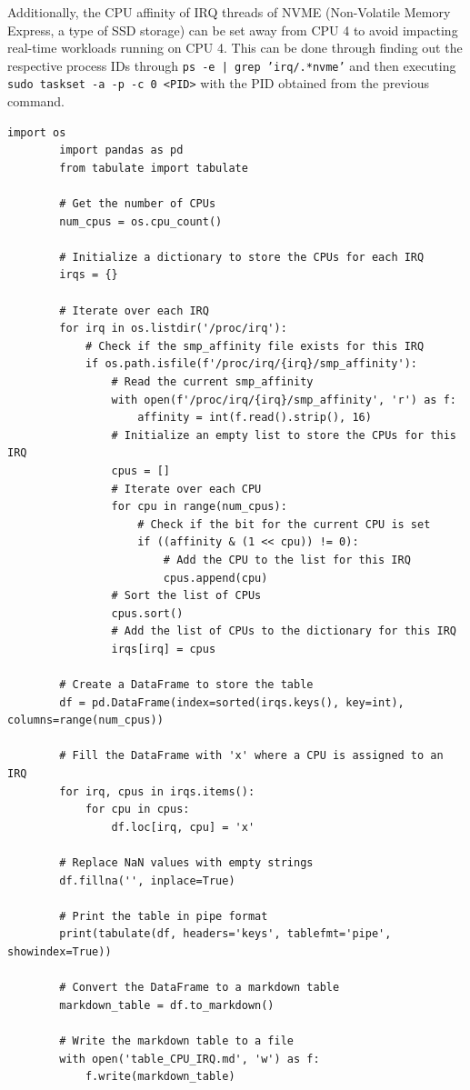 \documentclass[MMR,Master,english]{twbook}
\begin{document}
Additionally, the CPU affinity of IRQ threads of NVME (Non-Volatile Memory Express, a type of SSD storage) can be set away from CPU 4 to avoid impacting real-time workloads running on CPU 4. This can be done through finding out the respective process IDs through \texttt{ps -e | grep 'irq/.*nvme'} and then executing \texttt{sudo taskset -a -p -c 0 <PID>} with the PID obtained from the previous command.


\vspace{1em}
\begin{minipage}{0.95\columnwidth}
	\begin{lstlisting}[name={Check distribution of interrupt requests across each CPU},label={script:smp_affinity}]
		import os
		import pandas as pd
		from tabulate import tabulate
		
		# Get the number of CPUs
		num_cpus = os.cpu_count()
		
		# Initialize a dictionary to store the CPUs for each IRQ
		irqs = {}
		
		# Iterate over each IRQ
		for irq in os.listdir('/proc/irq'):
			# Check if the smp_affinity file exists for this IRQ
			if os.path.isfile(f'/proc/irq/{irq}/smp_affinity'):
				# Read the current smp_affinity
				with open(f'/proc/irq/{irq}/smp_affinity', 'r') as f:
					affinity = int(f.read().strip(), 16)
				# Initialize an empty list to store the CPUs for this IRQ
				cpus = []
				# Iterate over each CPU
				for cpu in range(num_cpus):
					# Check if the bit for the current CPU is set
					if ((affinity & (1 << cpu)) != 0):
						# Add the CPU to the list for this IRQ
						cpus.append(cpu)
				# Sort the list of CPUs
				cpus.sort()
				# Add the list of CPUs to the dictionary for this IRQ
				irqs[irq] = cpus
		
		# Create a DataFrame to store the table
		df = pd.DataFrame(index=sorted(irqs.keys(), key=int), columns=range(num_cpus))
		
		# Fill the DataFrame with 'x' where a CPU is assigned to an IRQ
		for irq, cpus in irqs.items():
			for cpu in cpus:
				df.loc[irq, cpu] = 'x'
		
		# Replace NaN values with empty strings
		df.fillna('', inplace=True)
		
		# Print the table in pipe format
		print(tabulate(df, headers='keys', tablefmt='pipe', showindex=True))
		
		# Convert the DataFrame to a markdown table
		markdown_table = df.to_markdown()
		
		# Write the markdown table to a file
		with open('table_CPU_IRQ.md', 'w') as f:
			f.write(markdown_table)
\end{lstlisting}
\end{minipage}
\end{document}
